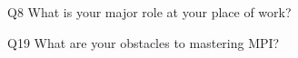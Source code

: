\begin{description}%
\item{Q8} What is your major role at your place of work?%
\item{Q19} What are your obstacles to mastering MPI?%
\end{description}%
